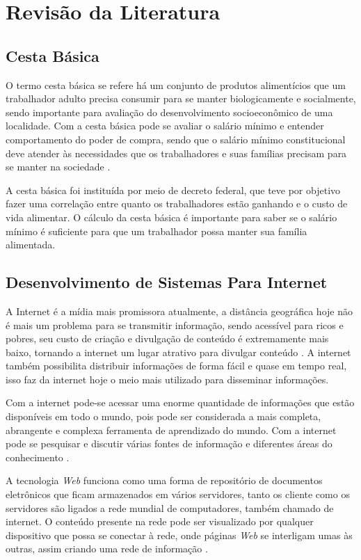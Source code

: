 \documentclass{ifto-tex}
\begin{document}
\chapter{Revisão da Literatura}
	
	\section{Cesta Básica}
O termo cesta básica se refere há um conjunto de produtos alimentícios que um trabalhador adulto precisa consumir para se manter biologicamente e socialmente, sendo importante para avaliação do desenvolvimento socioeconômico de uma localidade. Com a cesta básica pode se avaliar o salário mínimo e entender comportamento do poder de compra, sendo que o salário mínimo constitucional deve atender às necessidades que os trabalhadores e suas famílias precisam para se manter na sociedade \cite{araujo2007impacto}.

A cesta básica foi instituída por meio de decreto federal, que teve por objetivo fazer uma correlação entre quanto os trabalhadores estão ganhando e o custo de vida alimentar. O cálculo da cesta básica é importante para saber se o salário mínimo é suficiente para que um trabalhador possa manter sua família alimentada.

\section{Desenvolvimento de Sistemas Para Internet}
A Internet é a mídia mais promissora atualmente, a distância geográfica hoje não é mais um problema para se transmitir informação, sendo acessível para ricos e pobres, seu custo de criação e divulgação de conteúdo é extremamente mais baixo, tornando a internet um lugar atrativo para divulgar conteúdo \cite{moran1997utilizar}. A internet também possibilita distribuir informações de forma fácil e quase em tempo real, isso faz da internet hoje o meio mais utilizado para disseminar informações.

Com a internet pode-se acessar uma enorme quantidade de informações que estão disponíveis em todo o mundo, pois pode ser considerada a mais completa, abrangente e complexa ferramenta de aprendizado do mundo. Com a internet pode se pesquisar e discutir várias fontes de informação e diferentes áreas do conhecimento \cite{garcia2002internet}.

A tecnologia \textit{Web} funciona como uma forma de repositório de documentos eletrônicos que ficam armazenados em vários servidores, tanto os cliente como os servidores são ligados a rede mundial de computadores, também chamado de internet. O conteúdo presente na rede pode ser visualizado por qualquer dispositivo que possa se conectar à rede, onde páginas \textit{Web} se interligam umas às outras, assim criando uma rede de informação \cite{junior2009sistemas}.
\end{document}
